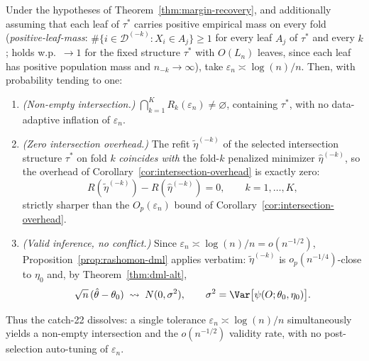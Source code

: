 \begin{corollary}
\label{cor:margin-resolution}
Under the hypotheses of Theorem~\ref{thm:margin-recovery}, and additionally
assuming that each leaf of $\tau^\ast$ carries positive empirical mass on every
fold (\emph{positive-leaf-mass}: $\#\{i\in\mathcal{D}^{(-k)}:X_i\in A_j\}\ge1$ for
every leaf $A_j$ of $\tau^\ast$ and every $k$; holds w.p.\ $\to1$ for the fixed
structure $\tau^\ast$ with $O(L_n)$ leaves, since each leaf has positive
population mass and $n_{-k}\to\infty$), take $\varepsilon_n\asymp \log(n)/n$.
Then, with probability tending to one:
\begin{enumerate}
\item[(a)] \emph{(Non-empty intersection.)}
  $\bigcap_{k=1}^K R_k(\varepsilon_n)\neq\varnothing$, containing $\tau^\ast$,
  with no data-adaptive inflation of $\varepsilon_n$.
\item[(b)] \emph{(Zero intersection overhead.)} The refit
  $\tilde{\eta}^{(-k)}$ of the selected intersection structure $\tau^\ast$ on
  fold $k$ \emph{coincides with} the fold-$k$ penalized minimizer
  $\hat\eta^{(-k)}$, so the overhead of
  Corollary~\ref{cor:intersection-overhead} is exactly zero:
  \[
    R(\tilde\eta^{(-k)}) - R(\hat\eta^{(-k)}) = 0,
    \qquad k=1,\dots,K,
  \]
  strictly sharper than the $O_p(\varepsilon_n)$ bound of
  Corollary~\ref{cor:intersection-overhead}.
\item[(c)] \emph{(Valid inference, no conflict.)} Since
  $\varepsilon_n\asymp\log(n)/n = o(n^{-1/2})$, Proposition~\ref{prop:rashomon-dml}
  applies verbatim: $\tilde\eta^{(-k)}$ is $o_p(n^{-1/4})$-close to $\eta_0$ and,
  by Theorem~\ref{thm:dml-alt},
  \[
    \sqrt{n}\,(\hat\theta - \theta_0)\;\leadsto\; N(0,\sigma^2),
    \qquad \sigma^2 = \Var\bigl[\psi(O;\theta_0,\eta_0)\bigr].
  \]
\end{enumerate}
Thus the catch-22 dissolves: a single tolerance $\varepsilon_n\asymp\log(n)/n$
simultaneously yields a non-empty intersection and the $o(n^{-1/2})$ validity
rate, with no post-selection auto-tuning of $\varepsilon_n$.
\end{corollary}

